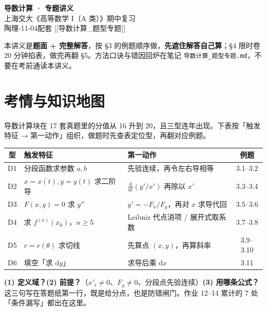 \documentclass[11pt,a4paper]{ctexart}
\newcommand{\D}{\mathrm{d}}
\begin{document}
\begin{center}
  {\LARGE\bfseries 导数计算 · 专题讲义}\\[4pt]
  {\large 上海交大《高等数学 I（A 类）》期中复习}\\[4pt]
  {\small 陶理-11-04\quad 配套 [[导数计算\_题型专题]]}
\end{center}

\begin{keypoint}[怎么用这本]
本讲义是\textbf{题面 + 完整解答}，按 \S 3 的例题顺序做，\textbf{先遮住解答自己算}；\S 4 限时卷 20 分钟掐表，做完再翻 \S 5。方法口诀与错因回炉在笔记 \texttt{导数计算\_题型专题.md}，不要在考前通读本讲义。
\end{keypoint}

\section{考情与知识地图}

导数计算块在 17 套真题里的分值从 16 升到 20，且三型连年出现。下表按「触发特征 → 第一动作」组织，做题时先查表定位型，再翻对应例题。

\begin{center}
\begin{tabularx}{15.2cm}{@{}c l X c@{}}
\toprule
型 & 触发特征 & 第一动作 & 例题 \\
\midrule
D1 & 分段函数求参数 $a,b$ & 先验连续，再令左右导相等 & 3.1--3.2 \\
D2 & $x=x(t),y=y(t)$ 求二阶导 & $\frac{\D}{\D t}(y'/x')$ 再除以 $x'$ & 3.3--3.4 \\
D3 & $F(x,y)=0$ 求 $y''$ & $y'=-F_x/F_y$，再对 $x$ 求导代回 & 3.5--3.6 \\
D4 & 求 $f^{(n)}(x_0)$，$n\ge5$ & Leibniz 代点消项 / 展开式取系数 & 3.7--3.8 \\
D5 & $r=r(\theta)$ 求切线 & 先算点 $(x,y)$，再算斜率 & 3.9--3.10 \\
D6 & 填空「求 $\D y$」 & 求导后乘 $\D x$ & 3.11 \\
\bottomrule
\end{tabularx}
\end{center}

\begin{methodbox}
\textbf{(1) 定义域？}\quad \textbf{(2) 前提？}（$x'_t\ne0$、$F_y\ne0$、分段点先验连续）\quad \textbf{(3) 用哪条公式？}\\
这三句写在答题纸第一行，既是给分点，也是防错闸门。作业 12--14 累计的 7 处「条件漏写」都出在这里。
\end{methodbox}
\end{document}
